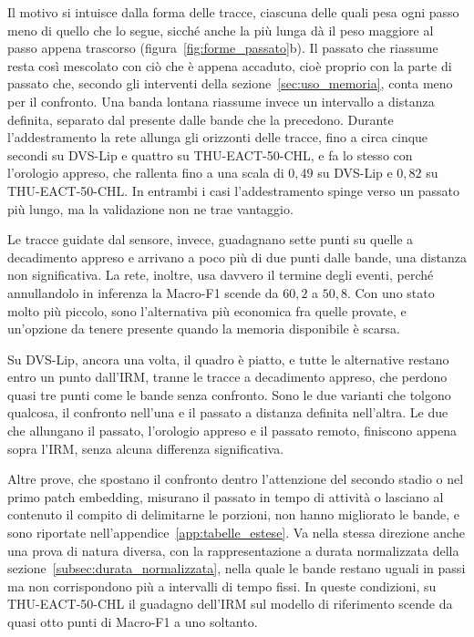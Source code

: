 Il motivo si intuisce dalla forma delle tracce, ciascuna delle quali pesa ogni passo meno di quello che lo segue, sicché anche la più lunga dà il peso maggiore al passo appena trascorso (figura~\ref{fig:forme_passato}b). Il passato che riassume resta così mescolato con ciò che è appena accaduto, cioè proprio con la parte di passato che, secondo gli interventi della sezione~\ref{sec:uso_memoria}, conta meno per il confronto. Una banda lontana riassume invece un intervallo a distanza definita, separato dal presente dalle bande che la precedono. Durante l'addestramento la rete allunga gli orizzonti delle tracce, fino a circa cinque secondi su DVS-Lip e quattro su THU-EACT-50-CHL, e fa lo stesso con l'orologio appreso, che rallenta fino a una scala di $0{,}49$ su DVS-Lip e $0{,}82$ su THU-EACT-50-CHL. In entrambi i casi l'addestramento spinge verso un passato più lungo, ma la validazione non ne trae vantaggio.

Le tracce guidate dal sensore, invece, guadagnano sette punti su quelle a decadimento appreso e arrivano a poco più di due punti dalle bande, una distanza non significativa. La rete, inoltre, usa davvero il termine degli eventi, perché annullandolo in inferenza la Macro-F1 scende da $60{,}2$ a $50{,}8$. Con uno stato molto più piccolo, sono l'alternativa più economica fra quelle provate, e un'opzione da tenere presente quando la memoria disponibile è scarsa.

Su DVS-Lip, ancora una volta, il quadro è piatto, e tutte le alternative restano entro un punto dall'IRM, tranne le tracce a decadimento appreso, che perdono quasi tre punti come le bande senza confronto. Sono le due varianti che tolgono qualcosa, il confronto nell'una e il passato a distanza definita nell'altra. Le due che allungano il passato, l'orologio appreso e il passato remoto, finiscono appena sopra l'IRM, senza alcuna differenza significativa.

Altre prove, che spostano il confronto dentro l'attenzione del secondo stadio o nel primo patch embedding, misurano il passato in tempo di attività o lasciano al contenuto il compito di delimitarne le porzioni, non hanno migliorato le bande, e sono riportate nell'appendice~\ref{app:tabelle_estese}. Va nella stessa direzione anche una prova di natura diversa, con la rappresentazione a durata normalizzata della sezione~\ref{subsec:durata_normalizzata}, nella quale le bande restano uguali in passi ma non corrispondono più a intervalli di tempo fissi. In queste condizioni, su THU-EACT-50-CHL il guadagno dell'IRM sul modello di riferimento scende da quasi otto punti di Macro-F1 a uno soltanto.

